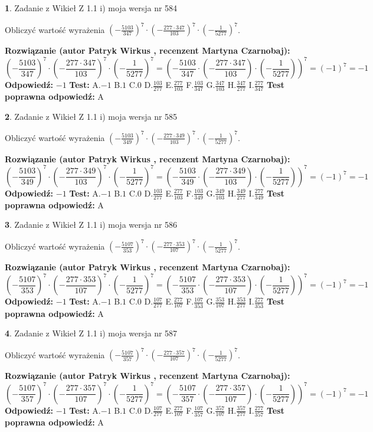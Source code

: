 \documentclass[12pt, a4paper]{article}
\theoremstyle{definition} %
\newtheorem{zad}{}
\newcommand{\zadStart}[1]{\begin{zad}#1\newline}
\newcommand{\zadStop}{\end{zad}}
\newcommand{\rozwStart}[2]{\noindent \textbf{Rozwiązanie (autor #1 , recenzent #2): }\newline}
\newcommand{\rozwStop}{\newline}
\newcommand{\odpStart}{\noindent \textbf{Odpowiedź:}\newline}
\newcommand{\odpStop}{\newline}
\newcommand{\testStart}{\noindent \textbf{Test:}\newline}
\newcommand{\testStop}{\newline}
\newcommand{\kluczStart}{\noindent \textbf{Test poprawna odpowiedź:}\newline}
\newcommand{\kluczStop}{\newline}
\begin{document}
\zadStart{Zadanie z Wikieł Z 1.1 i) moja wersja nr 584}

Obliczyć wartość wyrażenia $(-\frac{5103}{347})^{7} \cdot (-\frac{277 \cdot 347}{103})^{7} \cdot (-\frac{1}{5277})^{7}$.
\zadStop
\rozwStart{Patryk Wirkus}{Martyna Czarnobaj}
$$(-\frac{5103}{347})^{7} \cdot (-\frac{277 \cdot 347}{103})^{7} \cdot (-\frac{1}{5277})^{7} = (-\frac{5103}{347} \cdot (-\frac{277 \cdot 347}{103}) \cdot (-\frac{1}{5277}))^{7} = (-1)^{7} = -1$$
\rozwStop
\odpStart
$-1$
\odpStop
\testStart
A.$-1$ B.$1$ C.$0$ D.$\frac{103}{277}$ E.$\frac{277}{103}$
F.$\frac{103}{347}$ G.$\frac{347}{103}$
H.$\frac{347}{277}$
I.$\frac{277}{347}$
\testStop
\kluczStart
A
\kluczStop



\zadStart{Zadanie z Wikieł Z 1.1 i) moja wersja nr 585}

Obliczyć wartość wyrażenia $(-\frac{5103}{349})^{7} \cdot (-\frac{277 \cdot 349}{103})^{7} \cdot (-\frac{1}{5277})^{7}$.
\zadStop
\rozwStart{Patryk Wirkus}{Martyna Czarnobaj}
$$(-\frac{5103}{349})^{7} \cdot (-\frac{277 \cdot 349}{103})^{7} \cdot (-\frac{1}{5277})^{7} = (-\frac{5103}{349} \cdot (-\frac{277 \cdot 349}{103}) \cdot (-\frac{1}{5277}))^{7} = (-1)^{7} = -1$$
\rozwStop
\odpStart
$-1$
\odpStop
\testStart
A.$-1$ B.$1$ C.$0$ D.$\frac{103}{277}$ E.$\frac{277}{103}$
F.$\frac{103}{349}$ G.$\frac{349}{103}$
H.$\frac{349}{277}$
I.$\frac{277}{349}$
\testStop
\kluczStart
A
\kluczStop



\zadStart{Zadanie z Wikieł Z 1.1 i) moja wersja nr 586}

Obliczyć wartość wyrażenia $(-\frac{5107}{353})^{7} \cdot (-\frac{277 \cdot 353}{107})^{7} \cdot (-\frac{1}{5277})^{7}$.
\zadStop
\rozwStart{Patryk Wirkus}{Martyna Czarnobaj}
$$(-\frac{5107}{353})^{7} \cdot (-\frac{277 \cdot 353}{107})^{7} \cdot (-\frac{1}{5277})^{7} = (-\frac{5107}{353} \cdot (-\frac{277 \cdot 353}{107}) \cdot (-\frac{1}{5277}))^{7} = (-1)^{7} = -1$$
\rozwStop
\odpStart
$-1$
\odpStop
\testStart
A.$-1$ B.$1$ C.$0$ D.$\frac{107}{277}$ E.$\frac{277}{107}$
F.$\frac{107}{353}$ G.$\frac{353}{107}$
H.$\frac{353}{277}$
I.$\frac{277}{353}$
\testStop
\kluczStart
A
\kluczStop



\zadStart{Zadanie z Wikieł Z 1.1 i) moja wersja nr 587}

Obliczyć wartość wyrażenia $(-\frac{5107}{357})^{7} \cdot (-\frac{277 \cdot 357}{107})^{7} \cdot (-\frac{1}{5277})^{7}$.
\zadStop
\rozwStart{Patryk Wirkus}{Martyna Czarnobaj}
$$(-\frac{5107}{357})^{7} \cdot (-\frac{277 \cdot 357}{107})^{7} \cdot (-\frac{1}{5277})^{7} = (-\frac{5107}{357} \cdot (-\frac{277 \cdot 357}{107}) \cdot (-\frac{1}{5277}))^{7} = (-1)^{7} = -1$$
\rozwStop
\odpStart
$-1$
\odpStop
\testStart
A.$-1$ B.$1$ C.$0$ D.$\frac{107}{277}$ E.$\frac{277}{107}$
F.$\frac{107}{357}$ G.$\frac{357}{107}$
H.$\frac{357}{277}$
I.$\frac{277}{357}$
\testStop
\kluczStart
A
\kluczStop
\end{document}
